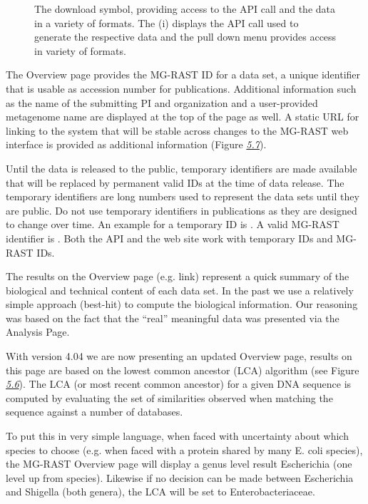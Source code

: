 \documentclass[letterpaper,10pt,english]{sphinxmanual}
\begin{document}
\begin{figure}[htbp]
\centering
\capstart

\noindent{}
\caption{The download symbol, providing access to the API call and the data in
a variety of formats. The (i) displays the API call used to generate
the respective data and the pull down menu provides access in variety
of formats.}\label{\detokenize{user_manual:fig-download-symbol}}\end{figure}

The Overview page provides the MG-RAST ID for a data set, a unique
identifier that is usable as accession number for publications.
Additional information such as the name of the submitting PI and
organization and a user-provided metagenome name are displayed at the
top of the page as well. A static URL for linking to the system that
will be stable across changes to the MG-RAST web interface is provided
as additional information (Figure {\hyperref[\detokenize{user_manual:fig:metagenome-overview}]{\emph{5.7}}}).

 Until the data is released to the public, temporary
identifiers are made available that will be replaced by permanent valid
IDs at the time of data release. The temporary identifiers are long
numbers used to represent the data sets until they are public. Do not
use temporary identifiers in publications as they are designed to change
over time. An example for a temporary ID is
. A valid MG-RAST identifier is
. Both the API and the web site work with temporary IDs
and MG-RAST IDs.

The results on the Overview page (e.g. link) represent a quick summary
of the biological and technical content of each data set. In the past we
use a relatively simple approach (best-hit) to compute the biological
information. Our reasoning was based on the fact that the “real”
meaningful data was presented via the Analysis Page.

With version 4.04 we are now presenting an updated Overview page,
results on this page are based on the lowest common ancestor (LCA)
algorithm (see Figure {\hyperref[\detokenize{user_manual:fig:lca}]{\emph{5.6}}}). The LCA (or most recent
common ancestor) for a given DNA sequence is computed by evaluating the
set of similarities observed when matching the sequence against a number
of databases.

To put this in very simple language, when faced with uncertainty about
which species to choose (e.g. when faced with a protein shared by many
E. coli species), the MG-RAST Overview page will display a genus level
result Escherichia (one level up from species). Likewise if no decision
can be made between Escherichia and Shigella (both genera), the LCA will
be set to Enterobacteriaceae.
\end{document}
